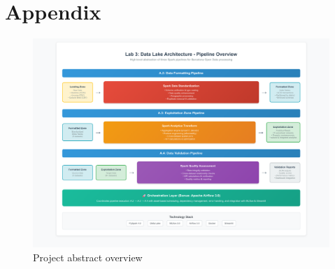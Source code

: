 \appendix

\section{Appendix}

\begin{figure}[H]
    \centering
    \includegraphics[width=1\linewidth]{latex/imgs/infra_overview.pdf}
    \caption{Project abstract overview}
    \label{fig:projov}
\end{figure}

